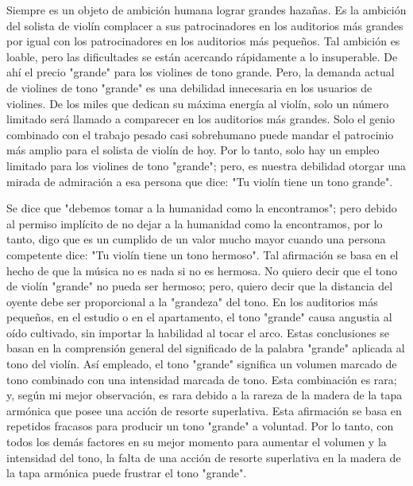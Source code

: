 \documentclass[12pt]{book}
\begin{document}
Siempre es un objeto de ambición humana lograr grandes hazañas. Es la ambición del solista de violín complacer a sus patrocinadores en los auditorios más grandes por igual con los patrocinadores en los auditorios más pequeños. Tal ambición es loable, pero las dificultades se están acercando rápidamente a lo insuperable. De ahí el precio "grande" para los violines de tono grande. Pero, la demanda actual de violines de tono "grande" es una debilidad innecesaria en los usuarios de violines. De los miles que dedican su máxima energía al violín, solo un número limitado será llamado a comparecer en los auditorios más grandes. Solo el genio combinado con el trabajo pesado casi sobrehumano puede mandar el patrocinio más amplio para el solista de violín de hoy. Por lo tanto, solo hay un empleo limitado para los violines de tono "grande"; pero, es nuestra debilidad otorgar una mirada de admiración a esa persona que dice: "Tu violín tiene un tono grande".

Se dice que "debemos tomar a la humanidad como la encontramos"; pero debido al permiso implícito de no dejar a la humanidad como la encontramos, por lo tanto, digo que es un cumplido de un valor mucho mayor cuando una persona competente dice: "Tu violín tiene un tono hermoso". Tal afirmación se basa en el hecho de que la música no es nada si no es hermosa. No quiero decir que el tono de violín "grande" no pueda ser hermoso; pero, quiero decir que la distancia del oyente debe ser proporcional a la "grandeza" del tono. En los auditorios más pequeños, en el estudio o en el apartamento, el tono "grande" causa angustia al oído cultivado, sin importar la habilidad al tocar el arco. Estas conclusiones se basan en la comprensión general del significado de la palabra "grande" aplicada al tono del violín. Así empleado, el tono "grande" significa un volumen marcado de tono combinado con una intensidad marcada de tono. Esta combinación es rara; y, según mi mejor observación, es rara debido a la rareza de la madera de la tapa armónica que posee una acción de resorte superlativa. Esta afirmación se basa en repetidos fracasos para producir un tono "grande" a voluntad. Por lo tanto, con todos los demás factores en su mejor momento para aumentar el volumen y la intensidad del tono, la falta de una acción de resorte superlativa en la madera de la tapa armónica puede frustrar el tono "grande".
\end{document}
